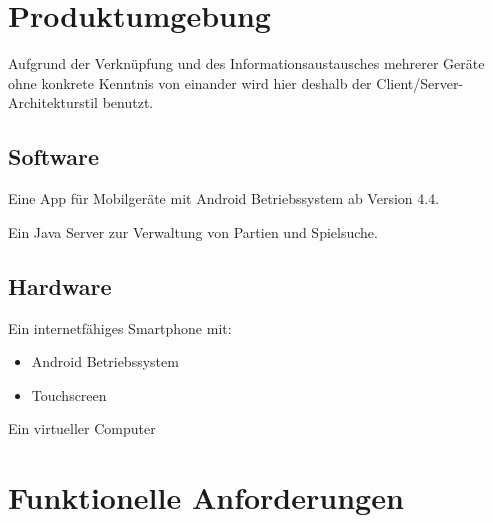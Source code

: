 \documentclass[parskip=full]{scrartcl}
\begin{document}
	\section{Produktumgebung}
	Aufgrund der Verknüpfung und des Informationsaustausches mehrerer Geräte ohne konkrete Kenntnis von einander wird hier deshalb der Client/Server-Architekturstil benutzt. 
	\subsection{Software}
	\begin{description}
		\item Eine App für Mobilgeräte mit \gls{Android} Betriebssystem ab Version 4.4.
		\item Ein Java Server zur Verwaltung von Partien und Spielsuche.		
	\end{description}
	\subsection{Hardware}
	\begin{description}			
		\item Ein internetfähiges \gls{Smartphone} mit:
		\begin{itemize}
			\item \gls{Android} Betriebssystem
			\item Touchscreen
		\end{itemize}
		\item Ein virtueller Computer
	\end{description}
	\pagebreak		  
	\section{Funktionelle Anforderungen}
\end{document}
